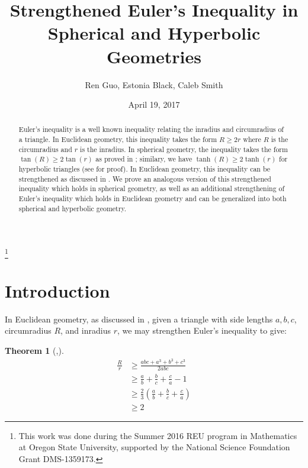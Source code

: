 \documentclass[12pt,notitlepage]{amsart}%
\newtheorem{theorem}{Theorem}[section]
\newcommand{\fracsum}{\frac{a}{b}+\frac{b}{c}+\frac{c}{a}}
\begin{document}
\title{Strengthened Euler's Inequality in Spherical and Hyperbolic Geometries}
\date{April 19, 2017}
\author{Ren Guo, Estonia Black, Caleb Smith}
\address{University of Tennessee, Knoxville}
\address{Oregon State University}



\thanks{This work was done during the Summer 2016 REU program
in Mathematics at Oregon State University, supported by the National Science Foundation Grant DMS-1359173.}

\begin{abstract}
Euler's inequality is a well known inequality relating the inradius and circumradius of a triangle. In Euclidean geometry, this inequality takes the form $R \geq 2r$ where $R$ is the circumradius and $r$ is the inradius. In spherical geometry, the inequality takes the form $\tan(R) \geq 2\tan(r)$ as proved in \cite{MPV}; similary, we have $\tanh(R) \geq 2\tanh(r)$ for hyperbolic triangles (see \cite{SV} for proof). In Euclidean geometry, this inequality can be strengthened as discussed in \cite{SV}. We prove an analogous version of this strengthened inequality which holds in spherical geometry, as well as an additional strengthening of Euler's inequality which holds in Euclidean geometry and can be generalized into both spherical and hyperbolic geometry.
\end{abstract}

\maketitle
{}


\section{Introduction}
In Euclidean geometry, as discussed in \cite{SV}, given a triangle with side lengths $a,b,c$, circumradius $R$, and inradius $r$, we may strengthen Euler's inequality to give:
\begin{theorem}[\cite{SU},\cite{VW}]\label{original}
\begin{subequations}
	\begin{align} 
	\frac{R}{r} &\geq \frac{abc + a^3+b^3+c^3}{2abc} \label{originalA} \\ 
			&\geq \fracsum - 1 \label{originalB} \\ 	
			&\geq \frac{2}{3} \left( \fracsum\right) \label{originalC} \\ 
			&\geq 2 \label{originalD} 
	\end{align} 
\end{subequations} 
\end{theorem}
\end{document}
